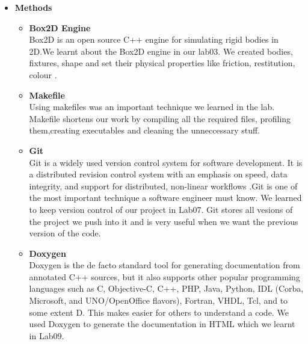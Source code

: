 \documentclass{article}
\begin{document}
\begin{itemize}
	\item[] \textbf{\LARGE Methods} \\
        \begin{itemize}[label=$\blacksquare$] \vspace{0cm}

            \item \textbf{\Large Box2D Engine }\\
            \large Box2D is an open source C++ engine for simulating rigid bodies in 2D.We learnt about the Box2D engine in our lab03. We created bodies, fixtures, shape and set their physical properties like friction, restitution, colour \cite{colour}.\vspace{0.60 cm}

            \item \textbf{\Large Makefile }\\ 
            \large Using makefiles \cite{Makefile} was an important technique we learned in the lab. Makefile shortens our work by compiling all the required files, profiling them,creating executables and cleaning the unneccessary stuff. \vspace{0.60 cm}

            \item \textbf{\Large Git }\\ 
            \large Git is a widely used version control system for software development. It is a distributed revision control system with an emphasis on speed, data integrity, and support for distributed, non-linear workflows .Git \cite{Git} is one of the most important technique a software engineer must know. We learned to keep version control of our project in Lab07. Git stores all vesions of the project we push into it and is very useful when we want the previous version of the code. \vspace{0.60 cm}

            \item \textbf{\Large Doxygen }\\ 
            \large Doxygen is the de facto standard tool for generating documentation from annotated C++ sources, but it also supports other popular programming languages such as C, Objective-C, C++, PHP, Java, Python, IDL (Corba, Microsoft, and UNO/OpenOffice flavors), Fortran, VHDL, Tcl, and to some extent D. This makes easier for others to understand a code. We used Doxygen \cite{Doxygen} to generate the documentation in HTML which we learnt in Lab09.  \vspace{0.60 cm}


\end{itemize}
\end{itemize}
\end{document}
